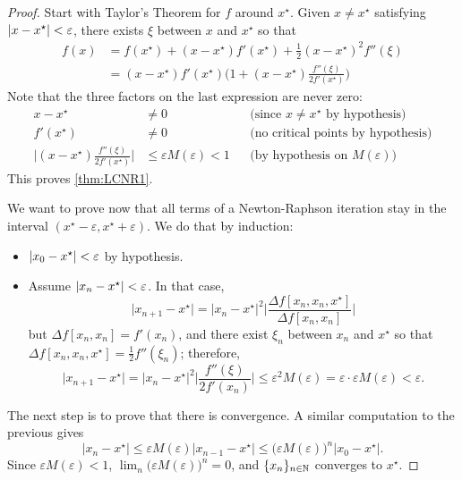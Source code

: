 \begin{proof}
Start with Taylor's Theorem for $f$ around $x^\star$.  Given $x\neq x^\star$ satisfying $\lvert x-x^\star \rvert < \varepsilon$, there exists $\xi$ between $x$ and $x^\star$ so that
\begin{align*}
f(x) &= f(x^\star) + (x-x^\star) f'(x^\star) + \tfrac{1}{2}(x-x^\star)^2 f''(\xi) \\
&= (x-x^\star)f'(x^\star) \bigg( 1 + (x-x^\star) \frac{f''(\xi)}{2f'(x^\star)} \bigg)
\end{align*}
Note that the three factors on the last expression are never zero:
\begin{align*}
x-x^\star &\neq 0 &&\text{(since }x \neq x^\star\text{ by hypothesis)} \\
f'(x^\star) &\neq 0 &&\text{(no critical points by hypothesis)} \\
\bigg\lvert (x-x^\star) \frac{f''(\xi)}{2f'(x^\star)} \bigg\rvert &\leq \varepsilon M(\varepsilon) < 1 &&\text{(by hypothesis on }M(\varepsilon))
\end{align*}
This proves \ref{thm:LCNR1}.

We want to prove now that all terms of a Newton-Raphson iteration stay in the interval $(x^\star - \varepsilon, x^\star + \varepsilon)$. We do that by induction:
\begin{itemize}
	\item $\lvert x_0 - x^\star \rvert<\varepsilon$ by hypothesis.
	\item Assume $\lvert x_n-x^\star \rvert < \varepsilon$.  In that case,
	\begin{equation*}
	\big\lvert x_{n+1} - x^\star \big\rvert = \big\lvert x_n - x^\star \big\rvert^2 \bigg\lvert \frac{\Delta f[x_n, x_n, x^\star]}{\Delta f[x_n, x_n]} \bigg\rvert
	\end{equation*}	
	but $\Delta f [x_n, x_n] = f'(x_n)$, and there exist $\xi_n$ between $x_n$ and $x^\star$ so that $\Delta f[x_n,x_n,x^\star] = \tfrac{1}{2}f''(\xi_n)$; therefore,
	\begin{equation*}
	\big\lvert x_{n+1} - x^\star \big\rvert = \big\lvert x_n - x^\star \big\rvert^2 \bigg\lvert \frac{f''(\xi)}{2f'(x_n)} \bigg\rvert \leq \varepsilon^2 M(\varepsilon) = \varepsilon \cdot \varepsilon M(\varepsilon) < \varepsilon.
	\end{equation*}
\end{itemize}
The next step is to prove that there is convergence.  A similar computation to the previous gives
\begin{equation*}
\big\lvert x_n - x^\star \big\rvert \leq \varepsilon M(\varepsilon) \big\lvert x_{n-1} - x^\star \big\rvert \leq \big( \varepsilon M(\varepsilon) \big)^n \big\lvert x_0 - x^\star \big\rvert.
\end{equation*}
Since $\varepsilon M(\varepsilon) < 1$, $\lim_n \big( \varepsilon M(\varepsilon) \big)^n = 0$, and $\{ x_n \}_{n \in \mathbb{N}}$ converges to $x^\star$.
\end{proof}

